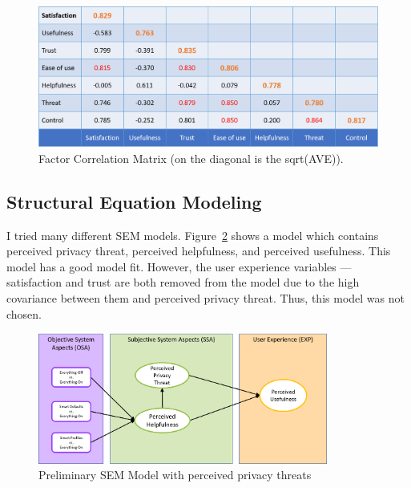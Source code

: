 \begin{figure}
	\centering
	\includegraphics[width=\textwidth]{figures/FactorCorrelationMatrix.png}
	\caption{Factor Correlation Matrix (on the diagonal is the sqrt(AVE)).}
	\label{fig:FactorCorrelationMatrix}
\end{figure}

\subsection{Structural Equation Modeling}

I tried many different SEM models. Figure~\ref{fig:semmodel1} shows a model which contains perceived privacy threat, perceived helpfulness, and perceived usefulness. This model has a good model fit. However, the user experience variables --- satisfaction and trust are both removed from the model due to the high covariance between them and perceived privacy threat. Thus, this model was not chosen.
\begin{figure}
	\centering
	\includegraphics[width=0.85\textwidth]{figures/semmodel1.png}
	\caption{Preliminary SEM Model with perceived privacy threats}
	\label{fig:semmodel1}
\end{figure}

